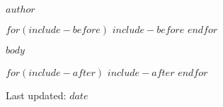 \documentclass[10pt,article,oneside]{memoir}
\begin{document}
\begin{center}
  \Huge \sffamily \bfseries $author$
\end{center}

$for(include-before)$
$include-before$
$endfor$

$body$

$for(include-after)$
$include-after$
$endfor$

\begin{center}
  Last updated: $date$  
\end{center}
\end{document}
